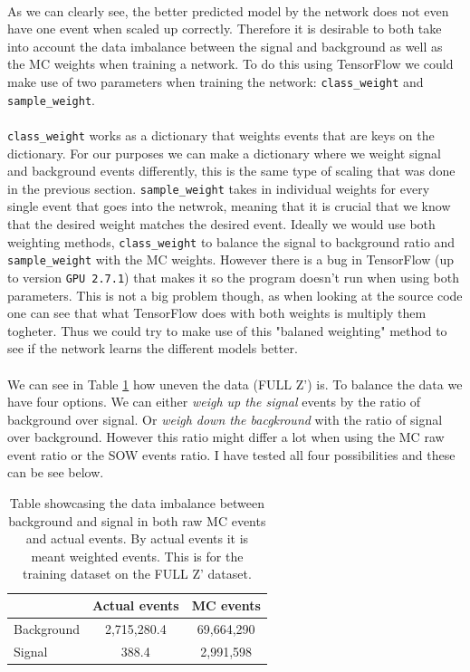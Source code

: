 \documentclass[14pt, a4paper]{book}
\begin{document}
\\As we can clearly see, the better predicted model by the network does not even have one event when scaled up correctly. Therefore it is desirable to both take into account the data imbalance between the signal and background as well as the MC weights when training a network. To do this using TensorFlow we could make use of two parameters when training the network: \verb|class_weight| and \verb|sample_weight|.
\\\\\verb|class_weight| works as a dictionary that weights events that are keys on the dictionary. For our purposes we can make a dictionary where we weight signal and background events differently, this is the same type of scaling that was done in the previous section. 
\verb|sample_weight| takes in individual weights for every single event that goes into the netwrok, meaning that it is crucial that we know that the desired weight matches the desired event. Ideally we would use both weighting methods, \verb|class_weight| to balance the signal to background ratio and \verb|sample_weight| with the MC weights. 
However there is a bug in TensorFlow (up to version \verb|GPU 2.7.1|) that makes it so the program doesn't run when using both parameters. This is not a big problem though, as when looking at the source code one can see that what TensorFlow does with both weights is multiply them togheter. Thus we could try to make use of this "balaned weighting" method to see if the network learns the different models better.\\
\\We can see in Table \ref{tab:MC_imbalance} how uneven the data (FULL Z') is. To balance the data we have four options. We can either \textit{weigh up the signal} events by the ratio of background over signal. Or \textit{weigh down the bacgkround} with the ratio of signal over background. However this ratio might differ a lot when using the MC raw event ratio or the SOW events ratio. I have tested all four possibilities and these can be see below.\\
\begin{table}[!h]
   \centering
   \caption[Imbalance raw events and SOW]{Table showcasing the data imbalance between background and signal in both raw MC events and actual events. By actual events it is meant weighted events. This is for the training dataset on the FULL Z' dataset.}
   \begin{tabular}{l|c|c}\midrule\midrule
                        & Actual events   & MC events \\\midrule
         Background     & 2,715,280.4     & 69,664,290  \\
         Signal         & 388.4           & 2,991,598   \\\midrule\midrule
   \end{tabular}
   \label{tab:MC_imbalance}
\end{table}
\end{document}
